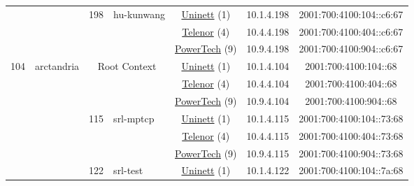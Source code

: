 \begin{small}
\begin{center}
\begin{longtable}{|c|c|c|c|c|c|c|c|}
  &  & \multirow{3}{*}{\tiny{198}} & \multicolumn{1}{|l|}{\multirow{3}{*}{\tiny{hu-kunwang}}} & \multicolumn{2}{|c|}{\tiny{\href{https://www.uninett.no}{Uninett} (1)}} & \tiny{10.1.4.198} & \tiny{2001:700:4100:104::c6:67} \\* \cline{5-5}\cline{6-6}\cline{7-7}\cline{8-8}
  &  &  &  & \multicolumn{2}{|c|}{\tiny{\href{https://www.telenor.no}{Telenor} (4)}} & \tiny{10.4.4.198} & \tiny{2001:700:4100:404::c6:67} \\* \cline{5-5}\cline{6-6}\cline{7-7}\cline{8-8}
  &  &  &  & \multicolumn{2}{|c|}{\tiny{\href{http://www.powertech.no}{PowerTech} (9)}} & \tiny{10.9.4.198} & \tiny{2001:700:4100:904::c6:67} \\ \hline
 \multirow{36}{*}{\tiny{104}} & \multicolumn{1}{|l|}{\multirow{36}{*}{\tiny{arctandria}}} & \multicolumn{2}{|c|}{\multirow{3}{*}{\tiny{Root Context}}} & \multicolumn{2}{|c|}{\tiny{\href{https://www.uninett.no}{Uninett} (1)}} & \tiny{10.1.4.104} & \tiny{2001:700:4100:104::68} \\* \cline{5-5}\cline{6-6}\cline{7-7}\cline{8-8}
  &  & \multicolumn{2}{|c|}{} & \multicolumn{2}{|c|}{\tiny{\href{https://www.telenor.no}{Telenor} (4)}} & \tiny{10.4.4.104} & \tiny{2001:700:4100:404::68} \\* \cline{5-5}\cline{6-6}\cline{7-7}\cline{8-8}
  &  & \multicolumn{2}{|c|}{} & \multicolumn{2}{|c|}{\tiny{\href{http://www.powertech.no}{PowerTech} (9)}} & \tiny{10.9.4.104} & \tiny{2001:700:4100:904::68} \\* \cline{3-3}\cline{4-4}\cline{5-5}\cline{6-6}\cline{7-7}\cline{8-8}
  &  & \multirow{3}{*}{\tiny{115}} & \multicolumn{1}{|l|}{\multirow{3}{*}{\tiny{srl-mptcp}}} & \multicolumn{2}{|c|}{\tiny{\href{https://www.uninett.no}{Uninett} (1)}} & \tiny{10.1.4.115} & \tiny{2001:700:4100:104::73:68} \\* \cline{5-5}\cline{6-6}\cline{7-7}\cline{8-8}
  &  &  &  & \multicolumn{2}{|c|}{\tiny{\href{https://www.telenor.no}{Telenor} (4)}} & \tiny{10.4.4.115} & \tiny{2001:700:4100:404::73:68} \\* \cline{5-5}\cline{6-6}\cline{7-7}\cline{8-8}
  &  &  &  & \multicolumn{2}{|c|}{\tiny{\href{http://www.powertech.no}{PowerTech} (9)}} & \tiny{10.9.4.115} & \tiny{2001:700:4100:904::73:68} \\* \cline{3-3}\cline{4-4}\cline{5-5}\cline{6-6}\cline{7-7}\cline{8-8}
  &  & \multirow{3}{*}{\tiny{122}} & \multicolumn{1}{|l|}{\multirow{3}{*}{\tiny{srl-test}}} & \multicolumn{2}{|c|}{\tiny{\href{https://www.uninett.no}{Uninett} (1)}} & \tiny{10.1.4.122} & \tiny{2001:700:4100:104::7a:68} \\* \cline{5-5}\cline{6-6}\cline{7-7}\cline{8-8}

\end{longtable}
\end{center}
\end{small}
